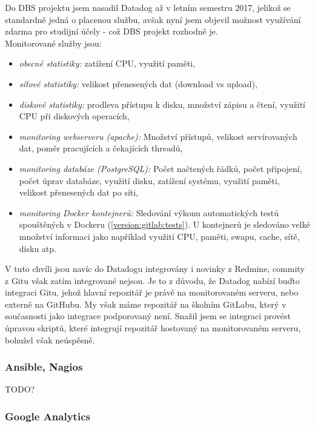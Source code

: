 Do DBS projektu jsem nasadil Datadog až v letním semestru 2017, jelikož se standardně jedná o placenou službu, avšak nyní jsem objevil možnost využívání zdarma pro studijní účely - což DBS projekt rozhodně je.\\
Monitorované služby jsou:
\begin{itemize}
	\item \emph{obecné statistiky:} zatížení CPU, využití paměti,
	\item \emph{síťové statistiky:} velikost přenesených dat (download vs upload),
	\item \emph{diskové statistiky:} prodleva přístupu k disku, množství zápisu a čtení, využití CPU při diskových operacích,
	\item \emph{monitoring webserveru (apache):} Množství přístupů, velikost servírovaných dat, poměr pracujících a čekajících threadů,
	\item \emph{monitoring databáze (PostgreSQL):} Počet načtených řádků, počet připojení, počet úprav databáze, využití disku, zatížení systému, využití paměti, velikost přenesených dat po síti,
	\item \emph{monitoring Docker kontejnerů:} Sledování výkonu automatických testů spouštěných v Dockeru (\ref{version:gitlab:tests}). U kontejnerů je sledováno velké množství informaci jako například využití CPU, paměti, swapu, cache, sítě, disku atp.
\end{itemize}
V tuto chvíli jsou navíc do Datadogu integrovány i novinky z Redmine, commity z Gitu však zatím integrované nejsou. Je to z důvodu, že Datadog nabízí buďto integraci Gitu, jehož hlavní repozitář je právě na monitorovaném serveru, nebo externě na GitHubu. My však máme repozitář na školním GitLabu, který v současnosti jako integrace podporovaný není. Snažil jsem se integraci provést úpravou skriptů, které integrují repozitář hostovaný na monitorovaném serveru, bohužel však neúspěsně.

\subsubsection{Ansible, Nagios}

TODO?

\subsubsection{Google Analytics}

